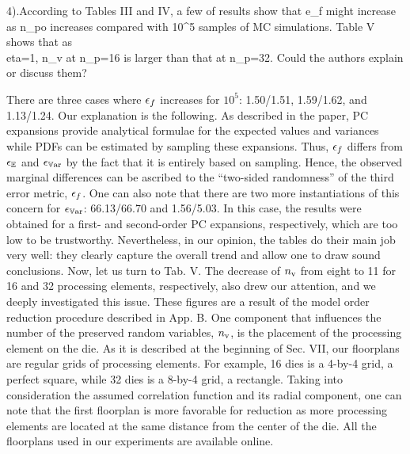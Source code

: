 \begin{reviewer}
4).According to Tables III and IV, a few of results show that e\_f might increase as n\_po increases compared with 10\^{}5 samples of MC simulations. Table V shows that as \\eta=1, n\_v at n\_p=16 is larger than that at n\_p=32. Could the authors explain or discuss them?
\end{reviewer}
\begin{authors}
There are three cases where $\epsilon_f$ increases for $10^5$: 1.50/1.51, 1.59/1.62, and 1.13/1.24.
Our explanation is the following.
As described in the paper, PC expansions provide analytical formulae for the expected values and variances while PDFs can be estimated by sampling these expansions.
Thus, $\epsilon_f$ differs from $\epsilon_\mathbb{E}$ and $\epsilon_{\mathbb{V}\text{ar}}$ by the fact that it is entirely based on sampling.
Hence, the observed marginal differences can be ascribed to the ``two-sided randomness'' of the third error metric, $\epsilon_f$.
One can also note that there are two more instantiations of this concern for $\epsilon_{\mathbb{V}\text{ar}}$: 66.13/66.70 and 1.56/5.03.
In this case, the results were obtained for a first- and second-order PC expansions, respectively, which are too low to be trustworthy.
Nevertheless, in our opinion, the tables do their main job very well: they clearly capture the overall trend and allow one to draw sound conclusions.
Now, let us turn to Tab. V.
The decrease of ${n_\text{v}}$ from eight to 11 for 16 and 32 processing elements, respectively, also drew our attention, and we deeply investigated this issue.
These figures are a result of the model order reduction procedure described in App. B.
One component that influences the number of the preserved random variables, ${n_\text{v}}$, is the placement of the processing element on the die.
As it is described at the beginning of Sec. VII, our floorplans are regular grids of processing elements.
For example, 16 dies is a 4-by-4 grid, a perfect square, while 32 dies is a 8-by-4 grid, a rectangle.
Taking into consideration the assumed correlation function and its radial component, one can note that the first floorplan is more favorable for reduction as more processing elements are located at the same distance from the center of the die.
All the floorplans used in our experiments are available online.
\end{authors}

